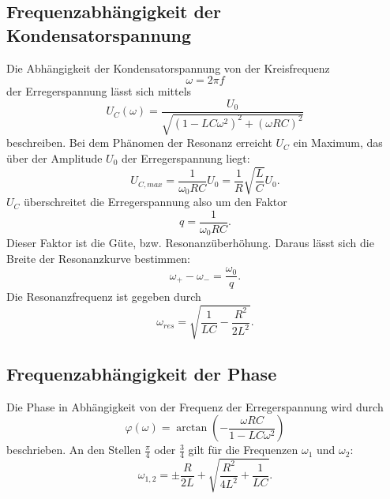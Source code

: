 \subsection{Frequenzabhängigkeit der Kondensatorspannung}
Die Abhängigkeit der Kondensatorspannung von der Kreisfrequenz
\begin{equation*}
    \omega = 2\pi f
\end{equation*}
der Erregerspannung lässt sich mittels 
\begin{equation}
    U_{C}(\omega)= \frac{U_{0}}{\sqrt{(1-LC\omega^{2})^{2} + (\omega R C)^{2}}}
\end{equation}
beschreiben.
Bei dem Phänomen der Resonanz erreicht $U_{C}$ ein Maximum, das über der Amplitude $U_{0}$ der Erregerspannung liegt:
\begin{equation}
    U_{C, max} = \frac{1}{\omega_{0}RC} U_{0} = \frac{1}{R} \sqrt{\frac{L}{C}} U_{0}.
\end{equation}
$U_{C}$ überschreitet die Erregerspannung also um den Faktor 
\begin{equation}
    q = \frac{1}{\omega_{0}RC}.
    \label{eqn:q}
\end{equation}
Dieser Faktor ist die Güte, bzw. Resonanzüberhöhung.
Daraus lässt sich die Breite der Resonanzkurve bestimmen:
\begin{equation}
    \omega_{+} - \omega_{-} = \frac{\omega_{0}}{q}.
    \label{eqn:breite}
\end{equation}
Die Resonanzfrequenz ist gegeben durch
\begin{equation}
    \omega_{res} = \sqrt{\frac{1}{LC} - \frac{R^2}{2L^2}}.
    \label{eqn:omega_res}
\end{equation}

\subsection{Frequenzabhängigkeit der Phase}
Die Phase in Abhängigkeit von der Frequenz der Erregerspannung wird durch
\begin{equation}
    \varphi(\omega) = \arctan(-\frac{\omega RC}{1-LC\omega^2})
    \label{eqn:phi}
\end{equation}
beschrieben.
An den Stellen $\frac{\pi}{4}$ oder $\frac{3}{4}$ gilt für die Frequenzen $\omega_{1}$
und $\omega_{2}$:
\begin{equation}
    \omega_{1,2} = \pm \frac{R}{2L} + \sqrt{\frac{R^2}{4L^2} + \frac{1}{LC}}.
    \label{eqn:omega_12}
\end{equation}